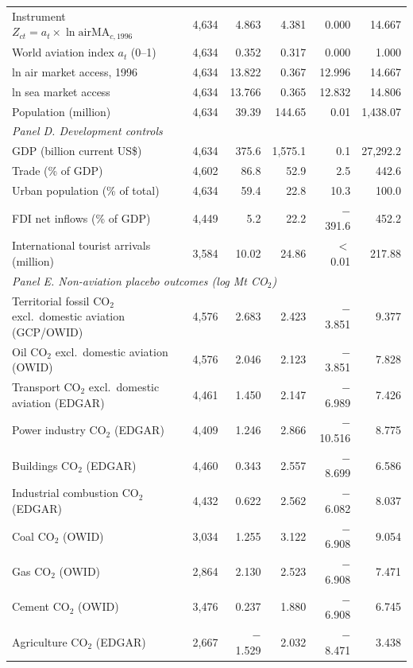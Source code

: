 \documentclass[12pt]{extarticle}
\begin{document}
\begin{table}[H]
{\begin{threeparttable}
\begin{tabular}{lrrrrr}
  Instrument $Z_{ct}=a_t\times\ln \mathrm{airMA}_{c,1996}$ & 4,634 & 4.863 & 4.381 & 0.000 & 14.667 \\
  World aviation index $a_t$ (0--1) & 4,634 & 0.352 & 0.317 & 0.000 & 1.000 \\
  ln air market access, 1996 & 4,634 & 13.822 & 0.367 & 12.996 & 14.667 \\
  ln sea market access & 4,634 & 13.766 & 0.365 & 12.832 & 14.806 \\
  Population (million) & 4,634 & 39.39 & 144.65 & 0.01 & 1,438.07 \\
\multicolumn{6}{l}{\textit{Panel D. Development controls}} \\
  GDP (billion current US\$) & 4,634 & 375.6 & 1,575.1 & 0.1 & 27,292.2 \\
  Trade (\% of GDP) & 4,602 & 86.8 & 52.9 & 2.5 & 442.6 \\
  Urban population (\% of total) & 4,634 & 59.4 & 22.8 & 10.3 & 100.0 \\
  FDI net inflows (\% of GDP) & 4,449 & 5.2 & 22.2 & $-$391.6 & 452.2 \\
  International tourist arrivals (million) & 3,584 & 10.02 & 24.86 & $<$0.01 & 217.88 \\
\multicolumn{6}{l}{\textit{Panel E. Non-aviation placebo outcomes (log Mt CO$_2$)}} \\
  Territorial fossil CO$_2$ excl.\ domestic aviation (GCP/OWID) & 4,576 & 2.683 & 2.423 & $-$3.851 & 9.377 \\
  Oil CO$_2$ excl.\ domestic aviation (OWID) & 4,576 & 2.046 & 2.123 & $-$3.851 & 7.828 \\
  Transport CO$_2$ excl.\ domestic aviation (EDGAR) & 4,461 & 1.450 & 2.147 & $-$6.989 & 7.426 \\
  Power industry CO$_2$ (EDGAR) & 4,409 & 1.246 & 2.866 & $-$10.516 & 8.775 \\
  Buildings CO$_2$ (EDGAR) & 4,460 & 0.343 & 2.557 & $-$8.699 & 6.586 \\
  Industrial combustion CO$_2$ (EDGAR) & 4,432 & 0.622 & 2.562 & $-$6.082 & 8.037 \\
  Coal CO$_2$ (OWID) & 3,034 & 1.255 & 3.122 & $-$6.908 & 9.054 \\
  Gas CO$_2$ (OWID) & 2,864 & 2.130 & 2.523 & $-$6.908 & 7.471 \\
  Cement CO$_2$ (OWID) & 3,476 & 0.237 & 1.880 & $-$6.908 & 6.745 \\
  Agriculture CO$_2$ (EDGAR) & 2,667 & $-$1.529 & 2.032 & $-$8.471 & 3.438 \\

\end{tabular}
\end{threeparttable}}
\end{table}
\end{document}
